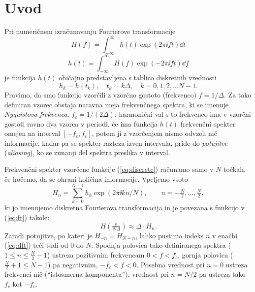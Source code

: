 \documentclass{article}
\begin{document}
\section{Uvod}

Pri numeričnem izračunavanju Fourierove transformacije
\begin{equation}
H(f) = \int_{-\infty}^\infty
h(t)\exp(2 \pi \ii f t)\dd t
\label{eq:ft}
\end{equation}
\begin{equation}
h(t) = \int_{-\infty}^\infty
H(f)\exp(-2 \pi \ii f t)\dd f
\end{equation}
je funkcija $h(t)$ običajno predstavljena s tablico diskretnih
vrednosti
\begin{equation}
  h_k = h(t_k),\quad t_k = k \Delta, \quad k=0,1,2,\dots N-1.
  \label{eq:discrete}
\end{equation}
Pravimo, da smo funkcijo vzorčili z vzorčno gostoto (frekvenco) $f=1/\Delta$.
Za tako definiran vzorec obstaja naravna meja frekvenčnega spektra,
ki se imenuje {\sl Nyquistova frekvenca}, $f_c =1/(2\Delta)$:
harmonični val s to frekvenco ima v vzorčni gostoti ravno
dva vzorca v periodi.
če ima funkcija $h(t)$ frekvenčni spekter omejen na interval
$[-f_c, f_c ]$, potem ji z vzorčenjem nismo odvzeli nič informacije,
kadar pa se spekter razteza izven intervala, pride do {\sl potujitve\/}
({\sl aliasing\/}), ko se zunanji del spektra preslika v interval.

Frekvenčni spekter vzorčene funkcije (\ref{eq:discrete}) računamo samo
v $N$ točkah, če hočemo, da se ohrani količina informacije.
Vpeljemo vsoto
\begin{equation}
H_n = \sum_{k=0}^{N-1}
h_k \exp(2 \pi \ii k n / N),
\qquad n=-\tfrac{N}{2},\dots ,\tfrac{N}{2},
\label{eq:dft}
\end{equation}
ki jo imenujemo diskretna Fourierova transformacija
in je povezana s funkcijo v (\ref{eq:ft}) takole:
\begin{equation*}
H(\tfrac{n}{N\Delta}) \approx \Delta\cdot H_n .
\end{equation*}
Zaradi potujitve, po kateri je $H_{-n} = H_{N-n}$, lahko pustimo
indeks $n$ v enačbi (\ref{eq:dft}) teči tudi od 0 do $N$. Spodnja polovica
tako definiranega spektra ($1 \le n \le \tfrac{N}{2}-1$) ustreza pozitivnim
frekvencam $0 < f < f_c$, gornja polovica ($\tfrac{N}{2}+1 \le N-1$)
pa negativnim, $-f_c < f < 0$.  Posebna vrednost pri $n=0$
ustreza frekvenci nič (``istosmerna komponenta''), vrednost
pri $n=N/2$ pa ustreza tako $f_c$ kot $-f_c$.
\end{document}

